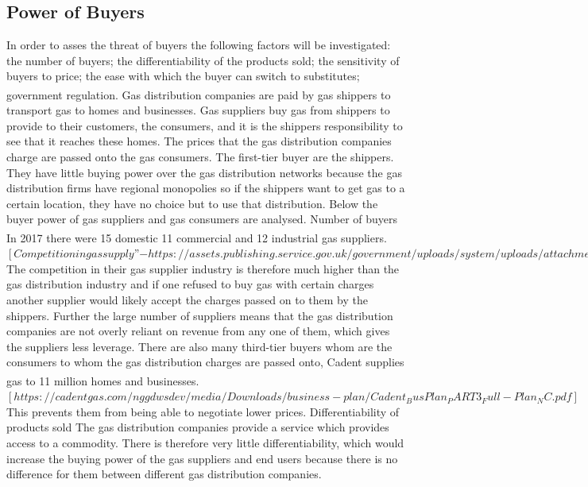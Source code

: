 \documentclass[11pt]{article}		%
\newcommand{\supercite}[1]{\textsuperscript{\cite{#1}}}		%
\begin{document}
		\subsection[Power of Buyers]{Power of Buyers}
		        In order to asses the threat of buyers the following factors will be investigated: the number of buyers; the differentiability of the products sold; the sensitivity of buyers to price; the ease with which the buyer can switch to substitutes; government regulation.\supercite{Barney}
                Gas distribution companies are paid by gas shippers to transport gas to homes and businesses. Gas suppliers buy gas from shippers to provide to their customers, the consumers, and it is the shippers responsibility to see that it reaches these homes. The prices that the gas distribution companies charge are passed onto the gas consumers. The first-tier buyer are the shippers. They have little buying power over the gas distribution networks because the gas distribution firms have regional monopolies so if the shippers want to get gas to a certain location, they have no choice but to use that distribution. Below the buyer power of gas suppliers and gas consumers are analysed.
                Number of buyers
                In 2017 there were 15 domestic  11 commercial and 12 industrial  gas suppliers.\supercite{competition_in_gas_supply}$[Competition in gas supply” - https://assets.publishing.service.gov.uk/government/uploads/system/uploads/attachment_data/file/743700/Competition_in_Gas_Supply.pdf]$ The competition in their gas supplier industry is therefore much higher than the gas distribution industry and if one refused to buy gas with certain charges another supplier would likely accept the charges passed on to them by the shippers. Further the large number of suppliers means that the gas distribution companies are not overly reliant on revenue from any one of them, which gives the suppliers less leverage. There are also many third-tier buyers whom are the consumers to whom the gas distribution charges are passed onto, Cadent supplies gas to 11 million homes and businesses. \supercite{Cadent_Plan} $[https://cadentgas.com/nggdwsdev/media/Downloads/business-plan/Cadent_BusPlan_PART3_Full-Plan_NC.pdf]$  This prevents them from being able to negotiate lower prices.
                Differentiability of products sold
                The gas distribution companies provide a service which provides access to a commodity. There is therefore very little differentiability, which would increase the buying power of the gas suppliers and end users because there is no difference for them between different gas distribution companies.
\end{document}

